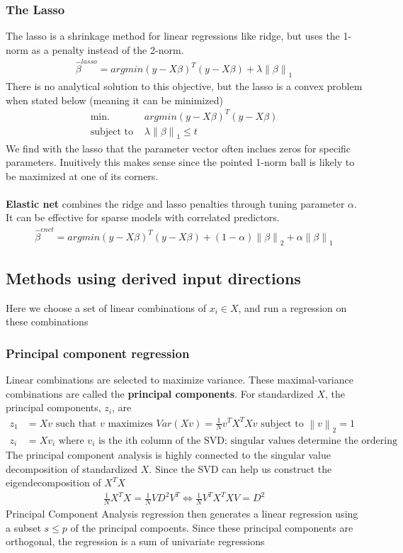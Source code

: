 \documentclass{article}
\newcommand{\norm}[2]{\left\lVert#1\right\rVert_#2}
\begin{document}
\subsubsection{The Lasso}
The lasso is a shrinkage method for linear regressions like ridge, but uses the 1-norm as a penalty instead of the 2-norm. 
\begin{align*}
  \hat{\beta}^{lasso} = argmin(y - X\beta)^T(y - X\beta) + \lambda \norm{\beta}{1}
\end{align*}
There is no analytical solution to this objective, but the lasso is a convex problem when stated below (meaning it can be minimized)
\begin{align*}
  \textrm{min. } & argmin(y - X\beta)^T(y - X\beta)\\
  \textrm{subject to } & \lambda \norm{\beta}{1} \leq t
\end{align*}
We find with the lasso that the parameter vector often inclues zeros for specific parameters. Inuitively this makes sense since the pointed 1-norm ball is likely to be maximized at one of its corners.\\\\
\textbf{Elastic net} combines the ridge and lasso penalties through tuning parameter $\alpha$. It can be effective for sparse models with correlated predictors.
\begin{align*}
  \hat{\beta}^{enet} = argmin(y - X\beta)^T(y - X\beta) + (1-\alpha) \norm{\beta}{2} + \alpha \norm{\beta}{1}
\end{align*}

\subsection{Methods using derived input directions}
Here we choose a set of linear combinations of $x_i \in X$, and run a regression on these combinations
\subsubsection{Principal component regression}
Linear combinations are selected to maximize variance. These maximal-variance combinations are called the \textbf{principal components}. For standardized $X$, the principal components, $z_i$, are
\begin{align*}
  z_1 &= Xv \textrm{ such that $v$ maximizes } Var(Xv) = \frac{1}{N}v^TX^TXv \textrm{ subject to } \norm{v}{2} = 1\\
  z_i &= Xv_i \textrm{ where $v_i$ is the ith column of the SVD; singular values determine the ordering}
\end{align*}
The principal component analysis is highly connected to the singular value decomposition of standardized $X$. Since the SVD can help us construct the eigendecomposition of $X^TX$
\begin{align*}
  \frac{1}{N}X^TX = \frac{1}{N}VD^2V^T \Longleftrightarrow \frac{1}{N}V^TX^TXV = D^2
\end{align*}
Principal Component Analysis regression then generates a linear regression using a subset $s \leq p$ of the principal compoents. Since these principal components are orthogonal, the regression is a sum of univariate regressions
\end{document}
